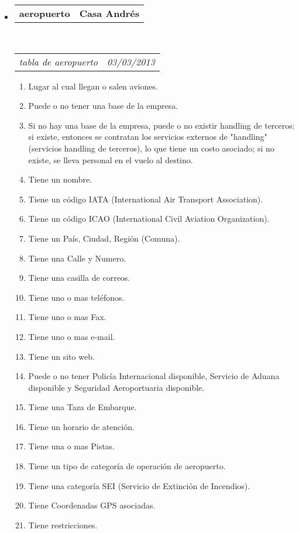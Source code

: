 \documentclass[10pt,letterpaper]{article}
\makeatletter
\newcommand{\headerrow}[2]
{\begin{tabular*}{\linewidth}{l@{\extracolsep{\fill}}r}
	#1 &
	#2 \\
\end{tabular*}}
\makeatother
\begin{document}
\begin{itemize}
	\parskip=0.1em

	\item
	\headerrow
		{\textbf{aeropuerto}}
		{\textbf{Casa Andrés}}
	\\
	\headerrow
		{\emph{tabla de aeropuerto}}
		{\emph{03/03/2013}}
	\begin{enumerate}
		\item Lugar al cual llegan o salen aviones.
		\item Puede o no tener una base de la empresa.
		\item Si no hay una base de la empresa, puede o no existir handling de terceros: si existe, entonces se contratan los servicios externos de "handling" (servicios handling de terceros), lo que tiene un costo asociado; si no existe, se lleva personal en el vuelo al destino.
		\item Tiene un nombre.
		\item Tiene un código IATA (International Air Transport Association).
		\item Tiene un código ICAO (International Civil Aviation Organization).
		\item Tiene un País, Ciudad, Región (Comuna).
		\item Tiene una Calle y Numero.
		\item Tiene una casilla de correos.
		\item Tiene uno o mas teléfonos.
		\item Tiene uno o mas Fax.
		\item Tiene uno o mas e-mail.
		\item Tiene un sito web.
		\item Puede o no tener Policía Internacional disponible, Servicio de Aduana disponible y Seguridad Aeroportuaria disponible.
		\item Tiene una Taza de Embarque.
		\item Tiene un horario de atención.
		\item Tiene una o mas Pistas.
		\item Tiene un tipo de categoría de operación de aeropuerto.
		\item Tiene una categoría SEI (Servicio de Extinción de Incendios).
		\item Tiene Coordenadas GPS asociadas.
		\item Tiene restricciones.
	\end{enumerate}

\end{itemize}
\end{document}
